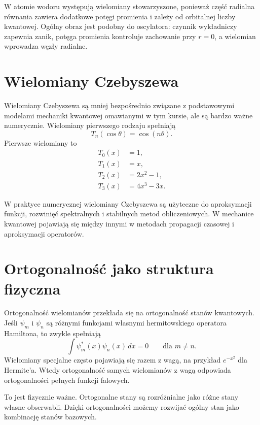 W atomie wodoru występują wielomiany stowarzyszone, ponieważ część radialna równania zawiera dodatkowe potęgi promienia i zależy od orbitalnej liczby kwantowej. Ogólny obraz jest podobny do oscylatora: czynnik wykładniczy zapewnia zanik, potęga promienia kontroluje zachowanie przy \(r=0\), a wielomian wprowadza węzły radialne.

\section{Wielomiany Czebyszewa}

Wielomiany Czebyszewa są mniej bezpośrednio związane z podstawowymi modelami mechaniki kwantowej omawianymi w tym kursie, ale są bardzo ważne numerycznie. Wielomiany pierwszego rodzaju spełniają
\begin{equation}
    T_n(\cos\theta)=\cos(n\theta).
\end{equation}
Pierwsze wielomiany to
\begin{align}
    T_0(x)&=1,\\
    T_1(x)&=x,\\
    T_2(x)&=2x^2-1,\\
    T_3(x)&=4x^3-3x.
\end{align}

W praktyce numerycznej wielomiany Czebyszewa są użyteczne do aproksymacji funkcji, rozwinięć spektralnych i stabilnych metod obliczeniowych. W mechanice kwantowej pojawiają się między innymi w metodach propagacji czasowej i aproksymacji operatorów.

\section{Ortogonalność jako struktura fizyczna}

Ortogonalność wielomianów przekłada się na ortogonalność stanów kwantowych. Jeśli \(\psi_m\) i \(\psi_n\) są różnymi funkcjami własnymi hermitowskiego operatora Hamiltona, to zwykle spełniają
\begin{equation}
    \int \psi_m^*(x)\psi_n(x)\,dx=0
    \qquad \text{dla } m\neq n.
\end{equation}
Wielomiany specjalne często pojawiają się razem z wagą, na przykład \(e^{-x^2}\) dla Hermite'a. Wtedy ortogonalność samych wielomianów z wagą odpowiada ortogonalności pełnych funkcji falowych.

To jest fizycznie ważne. Ortogonalne stany są rozróżnialne jako różne stany własne obserwabli. Dzięki ortogonalności możemy rozwijać ogólny stan jako kombinację stanów bazowych.

